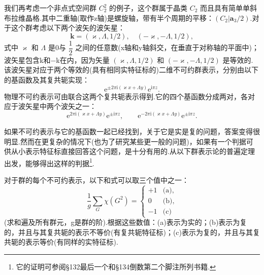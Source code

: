 我们再考虑一个非点式空间群 $C_2^2$ 的例子，这个群属于晶类 $C_2$ 而且具有简单单斜布拉维晶格.其中二重轴(取作z轴)是螺旋轴，带有半个周期的平移：$(C_2|\boldsymbol{a}_3/2)$.对于这个群考虑以下两个波矢的波矢星：
\begin{equation}
  \boldsymbol{k}=(\varkappa,\Lambda,1/2),\quad (-\varkappa,-\Lambda,1/2),
\end{equation}
式中 $\varkappa$ 和 $\Lambda$ 是0与 $\dfrac{1}{2}$ 之间的任意数(x轴和y轴斜交，在垂直于对称轴的平面中)；波矢星包含k和−k在内，因为矢量 $(\varkappa,\Lambda,1/2)$ 和 $(-\varkappa,-\Lambda,1/2)$ 是等效的.该波矢星对应于两个等效的(具有相同实特征标的)二维不可约群表示，分别由以下的基函数及其复共轭实现：
\begin{equation*}
  \mathrm{e}^{\pm2\pi\mathrm{i}(\varkappa x+\Lambda y)}\mathrm{e}^{\mathrm{i}\pi z}.
\end{equation*}
物理不可约表示可由联合这两个复共轭表示得到.它的四个基函数分成两对，各对应于波矢星中两个波矢之一：
\begin{equation*}
  \mathrm{e}^{2\pi\mathrm{i}(\varkappa x+\Lambda y)}\mathrm{e}^{\pm\mathrm{i}\pi z},\qquad
  \mathrm{e}^{-2\pi\mathrm{i}(\varkappa x+\Lambda y)}\mathrm{e}^{\pm\mathrm{i}\pi z}.
\end{equation*}

如果不可约表示与它的基函数一起已经找到，关于它是实是复的问题，答案变得很明显.然而在更复杂的情况下(也为了研究某些更一般的问题)，如果有一个判据可供从小表示特征标直接回答这个问题，是十分有用的.从以下群表示论的普遍定理出发，能够得出这样的判据\footnote{它的证明可参阅§132最后一个和§134倒数第二个脚注所列书籍.}.

对于群的每个不可约表示，以下和式可以取三个值中之一：
\begin{equation}
  \frac{1}{g}\sum_G\chi(G^2)=
  \begin{cases}
    +1 & \text{(a)},\\
    0 & \text{(b)},\\
    -1 & \text{(c)}
  \end{cases}
\end{equation}
(求和遍及所有群元，g是群的阶).根据这些数值：(a)表示为实的；(b)表示为复的，并且与其复共轭的表示不等价(有复共轭特征标)；(c)表示为复的，并且与其复共轭的表示等价(有同样的实特征标).

